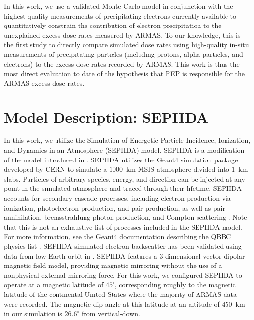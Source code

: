 \documentclass[draft]{agujournal2019}
\newcommand{\mathdeg}{^\circ}
\begin{document}
In this work, we use a validated Monte Carlo model in conjunction with the highest-quality measurements of precipitating electrons currently available to quantitatively constrain the contribution of electron precipitation to the unexplained excess dose rates measured by ARMAS. To our knowledge, this is the first study to directly compare simulated dose rates using high-quality in-situ measurements of precipitating particles (including protons, alpha particles, and electrons) to the excess dose rates recorded by ARMAS. This work is thus the most direct evaluation to date of the hypothesis that REP is responsible for the ARMAS excess dose rates.





\section{Model Description: SEPIIDA}
In this work, we utilize the Simulation of Energetic Particle Incidence, Ionization, and Dynamics in an Atmosphere (SEPIIDA) model. SEPIIDA is a modification of the model introduced in . SEPIIDA utilizes the Geant4 simulation package developed by CERN \cite{geant4} to simulate a $1000$~km MSIS atmosphere divided into $1$~km slabs. Particles of arbitrary species, energy, and direction can be injected at any point in the simulated atmosphere and traced through their lifetime. SEPIIDA accounts for secondary cascade processes, including electron production via ionization, photoelectron production, and pair production, as well as pair annihilation, bremsstrahlung photon production, and Compton scattering \cite{berland2023}. Note that this is not an exhaustive list of processes included in the SEPIIDA model. For more information, see the Geant4 documentation describing the QBBC physics list \cite{qbbc-docs}. SEPIIDA-simulated electron backscatter has been validated using data from low Earth orbit in . SEPIIDA features a 3-dimensional vector dipolar magnetic field model, providing magnetic mirroring without the use of a nonphysical external mirroring force. For this work, we configured SEPIIDA to operate at a magnetic latitude of $45\mathdeg$, corresponding roughly to the magnetic latitude of the continental United States where the majority of ARMAS data were recorded. The magnetic dip angle at this latitude at an altitude of $450$~km in our simulation is $26.6\mathdeg$ from vertical-down.
\end{document}
